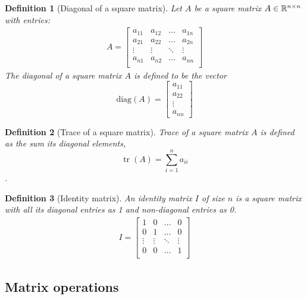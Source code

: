 \documentclass{article}
\newtheorem{defn}{Definition}
\DeclareMathOperator{\tr}{tr}
\begin{document}
\begin{defn}[Diagonal of a square matrix]
  Let $A$ be a square matrix $A \in \mathbb{R}^{n \times n}$  with   entries:
  \begin{align}
    A  =  \begin{bmatrix}
      a_{11}  &  a_{12} &   \dots &  a_{1n} \\
      a_{21}  &  a_{22} &   \dots &  a_{2n} \\
      \vdots  & \vdots &   \ddots  &  \vdots   \\
      a_{n1}  &  a_{n2} &   \dots &  a_{nn} \\
    \end{bmatrix}
  \end{align}
  The diagonal of a square matrix  $A$ is defined  to be the vector
  \[  \text{diag}(A)= \begin{bmatrix} a_{11} \\   a_{22} \\ \vdots  \\ a_{nn} \end{bmatrix}\]
\end{defn}


\begin{defn}[Trace of a square matrix]
  Trace  of a square matrix  $A$ is defined as the sum its diagonal elements,
  \[ \tr(A) = \sum_{i=1}^n a_{ii} \].
\end{defn}

\begin{defn}[Identity matrix]
  An identity matrix $I$ of size $n$ is  a square matrix with all its diagonal
  entries as 1 and non-diagonal entries as 0.
  \begin{align}
    I  =  \begin{bmatrix}
      1 & 0 & \dots & 0   \\
      0 & 1 & \dots & 0   \\
      \vdots   & \vdots &  \ddots  & \vdots \\
      0 & 0 & \dots & 1   \\
      \end{bmatrix}
    \end{align}
\end{defn}


\subsection{Matrix operations}
\end{document}
